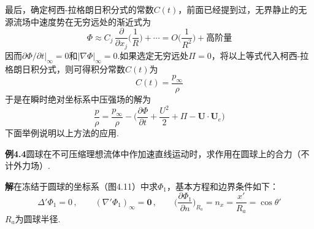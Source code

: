 最后，确定柯西-拉格朗日积分式的常数$C(t)$，前面已经提到过，无界静止的无源流场中速度势在无穷远处的渐近式为
\[
\Phi\approx C_j\,\frac{\partial}{\partial x_j}\Big(\frac{1}{R}\Big)+\cdots=O\Big(\frac{1}{R^{2}}\Big)+\text{高阶量}
\]
因而$\partial\Phi/\partial t|_\infty=0$和$|\nabla\Phi|_\infty=0$.如果选定无穷远处$\Pi=0$，将以上等式代入柯西-拉格朗日积分式，则可得积分常数$C(t)$为
\[
C(t)=\frac{p_\infty}{\rho}
\]
于是在瞬时绝对坐标系中压强场的解为
\begin{equation*}
\frac{p}{\rho}=\frac{p_\infty}{\rho}-\Big(\frac{\partial\Phi}{\partial t}+\frac{U^{2}}{2}+\Pi-\boldsymbol{U}\cdot\boldsymbol{U}_e\Big)
\tag{4.57}
\end{equation*}
下面举例说明以上方法的应用.

\noindent\textbf{例4.4}\quad 圆球在不可压缩理想流体中作加速直线运动时，求作用在圆球上的合力（不计外力场）.

\noindent\textbf{解}\quad 在冻结于圆球的坐标系（图4.11）中求$\Phi_1$，基本方程和边界条件如下：
\[
\Delta'\Phi_1=0\,,\qquad (\nabla'\Phi_1)_\infty=\boldsymbol{0}\,,\qquad \Big(\frac{\partial\Phi_1}{\partial n}\Big)_{R_a}=n_x=\frac{x'}{R_a}=\cos\theta'
\]
$R_a$为圆球半径.

